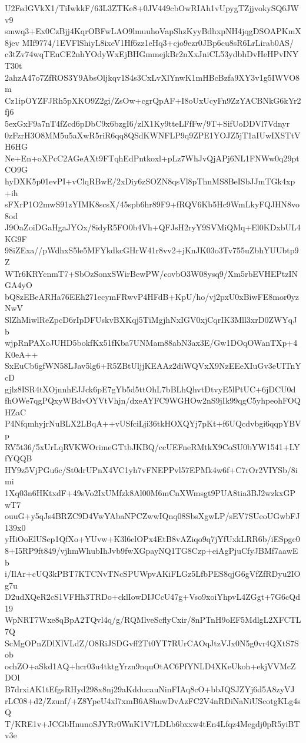 U2FsdGVkX1/TiIwkkF/63L3ZTKe8+0JV449cbOwRIAh1vUpygTZjjvokySQ6JWv9
smwq3+Ex0CzBjj4KqrOBFwLAO9lmuuhoVapShzKyyBdhxpNH4jqgDSOAPKmX8jev
MIf9774/1EVFlShiyL8ixeV1Hf6zz1eHq3+cjo9ezr0JBp6cu8sR6LrLirab0AS/
c3tZv74wqTEnCE2nhYOdyWxEjBHGmmejkBr2nXxJniCL53ydbhDvHeHPvINYT30t
2ahzA47o7ZfROS3Y9AbsOljkqv1S4s3CxLvXlYnwK1mHBcBzfa9XY3v1g5IWVO8m
Cz1ipOYZFJRh5pXKO9Z2gi/ZsOw+cgrQpAF+I8oUxUcyFn9ZzYACBNkG6kYr2fj6
5exGxF9a7nT4fZcd6pDbC9x6bzgI6/zlX1Ky9tteLFfFw/9T+SifUoDDVl7Vdnyr
0zFzrH3O8MM5u5aXwR5riR6qq8QSdKWNFLP9q9ZPE1YOJZ5jT1aIUwIXSTtVH6HG
Ne+En+oXPcC2AGeAXt9FTqhEdPntkoxl+pLz7WhJvQjAPj6NL1FNWw0q29ptCO9G
hyDXK5p01evPI+vClqRBwE/2xDiy6zSOZN8qsVl8pThnMS8BeISbJJmTGk4xp+ih
sFXrP1O2mwS91zYIMK8scsX/45spb6hr89F9+fRQV6Kb5Hc9WmLkyFQJHN8vo8od
J9OaZoiDGaHgaJYOx/8idyR5FO0b4Vh+QFJsH2ryY9SVMiQMq+El0KDxbUL4KG9F
98iZExa//pWdhxS5le5MFYkdkcGHrW41r8vv2+jKnJK03o3Tv755uZbhYUUbtp9Z
WTr6KRYcnmT7+SbOzSonxSWirBewPW/covbO3W08ysq9/Xm5rbEVHEPtzINGA4yO
bQ8zEBeARHa76EEh271ecymFRwvP4HFdB+KpU/ho/vj2pxU0xBiwFE8mor0yzNwV
SlZhMiwlReZpcD6rIpDFUskvBXKqj5TiMgjhNxIGV0xjCqrIK3Mll3xrD0ZWYqJb
wjpRnPAXoJUHD5bokfKx51fKba7UNMam88abN3ax3E/Gw1DOqOWanTXp+4K0eA++
SxEuCb6gfWN58LJav5lg6+R5ZBtUljjKEAAz2diWQVxX9NzEEeXIuGv3eUITnYcD
gjlz8ISR4tXOjnnhEJJck6pE7gYb5d5ttOhL7bBLhQhvtDtvyE5lPtUC+6jDCU0d
fhOWe7qgPQxyWBdvOYVtVhjn/dxeAYFC9WGHOw2nS9jIk99qgC5yhpeohFOQHZaC
P4NfqmhyjrNuBLX2LBqA++vUSfciLji36tkHOXQYj7pKt+f6UQcdvbgi6qqpYBVp
RV5t36/5xUrLqRVKWOrimeGTtbJKBQ/ccUEFneRMtkX9CoSU0bYW1541+LYfYQQB
HY9z5VjPGu6c/St0drUPnX4VC1yh7vFNEPPvl57EPMk4w6f+C7rOr2VIYSb/8imi
1Xq03n6HKtxdF+49sVo2IxUMfzk8Al00M6mCnXWmsgt9PUA8tia3BJ2wzkxGPwT7
ouuG+y5qJs4BRZC9D4VwYAbaNPCZwwIQnq08SbsXgwLP/sEV7SUeoUGwbFJ139x0
yHiOoElUSep1QfXo+YUvw+K3l6elOPx4EtB8vAZiqo9q7jYfUxkLRR6b/iESpgc0
8+I5RP9ft849/vjhmWhubIhJvb9fwXGpayNQ1TG8Czp+eiAgPjuCfyJBMf7aawEb
i/IlAr+cUQ3kPBT7KTCNvTNcSPUWpvAKiFLGz5LfbPES8qjG6gVfZfRDyu2IOg7u
D2udXQeR2cS1VFHh3TRDo+cklIowDIJCcU47g+Vso9xoiYhpvL4ZGgt+7G6cQd19
WpNRT7Wxe8qBpA2TQvl4q/g/RQMlveScflyCxir/8nPTnH9oEF5MdlgL2XFCTL7Q
ScMgOPnZDlXlVLdZ/O8RiJSDGvff2Tt0YT7RUrCAOqJtzVJx0N5g0vr4QXtS7Sob
ochZO+aSkd1AQ+hcr03u4tktgYrzn9nquOtAC6PfYNLD4XKeUkoh+ekjVVMcZDOl
B7drxiAK1tEfgsRHyd298x8nj29aKdducauNinFIAq8cO+bbJQSJZYj6d5A8zyVJ
rLC08+d2/Zzunf/+Z8YpeU4xl7xmB6A8huwDvAzFC2V4nRDiNaNiUScotgKLg4sQ
T/KRE1v+JCGbHnunoSJYRr0WnK1V7LDLb6bxxw4tEn4Lfqz4Megdj0pR5yiBTv3e

